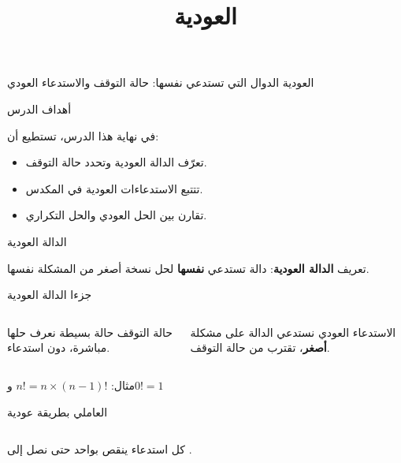 \documentclass[aspectratio=169, 11pt, t, xcolor={table}]{beamer}
\title{العودية}
\begin{document}
{العودية}
{الدوال التي تستدعي نفسها: حالة التوقف والاستدعاء العودي}

\begin{frame}{أهداف الدرس}
    \begin{tbox}{\faBullseye\quad في نهاية هذا الدرس، تستطيع أن:}
        \begin{itemize}
            \item تعرّف الدالة العودية وتحدد حالة التوقف.
            \item تتتبع الاستدعاءات العودية في المكدس.
            \item تقارن بين الحل العودي والحل التكراري.
        \end{itemize}
    \end{tbox}
\end{frame}

\begin{frame}{الدالة العودية}
    \begin{tbox}{\faLightbulb\quad تعريف}
        \textbf{الدالة العودية}: دالة تستدعي \textbf{نفسها} لحل نسخة أصغر من المشكلة نفسها.
    \end{tbox}
\end{frame}

\begin{frame}{جزءا الدالة العودية}
    \vspace{0.6cm}
    \begin{columns}[T]
        \begin{card}{حالة التوقف}
            حالة بسيطة نعرف حلها مباشرة، دون استدعاء.
        \end{card}
        \begin{card}{الاستدعاء العودي}
            نستدعي الدالة على مشكلة \textbf{أصغر}، تقترب من حالة التوقف.
        \end{card}
    \end{columns}
    \vspace{0.4cm}
    مثال: $n! = n \times (n-1)!$ \quad و\quad $0! = 1$
\end{frame}

\begin{frame}[t]{العاملي بطريقة عودية}
    \begin{columns}[T]
        {\small كل استدعاء ينقص  بواحد حتى نصل إلى .\par}
        \vspace{0.3cm}
    \end{columns}
\end{frame}
\end{document}

